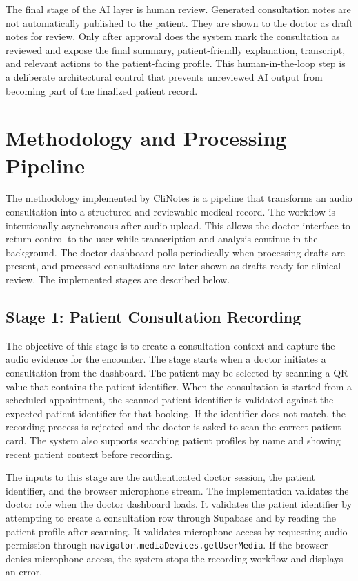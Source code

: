 The final stage of the AI layer is human review. Generated consultation notes are not automatically published to the patient. They are shown to the doctor as draft notes for review. Only after approval does the system mark the consultation as reviewed and expose the final summary, patient-friendly explanation, transcript, and relevant actions to the patient-facing profile. This human-in-the-loop step is a deliberate architectural control that prevents unreviewed AI output from becoming part of the finalized patient record.

\section{Methodology and Processing Pipeline}
\label{sec:methodology-processing-pipeline}

The methodology implemented by CliNotes is a pipeline that transforms an audio consultation into a structured and reviewable medical record. The workflow is intentionally asynchronous after audio upload. This allows the doctor interface to return control to the user while transcription and analysis continue in the background. The doctor dashboard polls periodically when processing drafts are present, and processed consultations are later shown as drafts ready for clinical review. The implemented stages are described below.

\subsection{Stage 1: Patient Consultation Recording}
\label{subsec:stage-recording}

The objective of this stage is to create a consultation context and capture the audio evidence for the encounter. The stage starts when a doctor initiates a consultation from the dashboard. The patient may be selected by scanning a QR value that contains the patient identifier. When the consultation is started from a scheduled appointment, the scanned patient identifier is validated against the expected patient identifier for that booking. If the identifier does not match, the recording process is rejected and the doctor is asked to scan the correct patient card. The system also supports searching patient profiles by name and showing recent patient context before recording.

The inputs to this stage are the authenticated doctor session, the patient identifier, and the browser microphone stream. The implementation validates the doctor role when the doctor dashboard loads. It validates the patient identifier by attempting to create a consultation row through Supabase and by reading the patient profile after scanning. It validates microphone access by requesting audio permission through \texttt{navigator.mediaDevices.getUserMedia}. If the browser denies microphone access, the system stops the recording workflow and displays an error.

